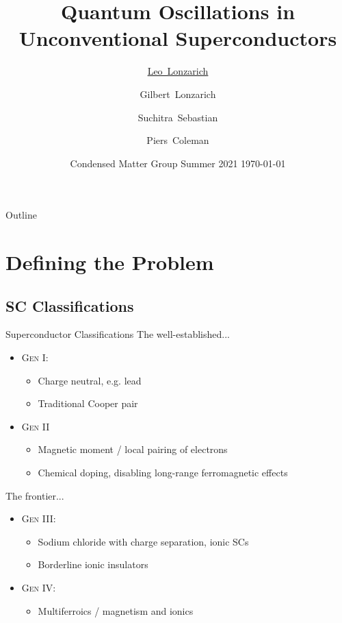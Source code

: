 \documentclass{beamer}
\title[Quantum Oscillations] 
{%
 Quantum Oscillations in\\ Unconventional Superconductors%
}
\author[Lonzarich]
{
  \underline{Leo~Lonzarich} \and Gilbert~Lonzarich\inst{1} \and Suchitra~Sebastian\inst{1} \and Piers~Coleman\inst{2}
  }
\institute[Cambridge]
{
\inst{1}%
Cavendish Laboratory, University of Cambridge, UK\\
\inst{2}%
Materials Theory Group, Rutgers University, USA
}
\date[CMS2021]
{Condensed Matter Group Summer 2021 \hfill \today}
\begin{document}
\begin{frame}
  \titlepage
\end{frame}

\begin{frame}{Outline}
  \tableofcontents
\end{frame}



\section{Defining the Problem}
\subsection{SC Classifications}

\begin{frame}
{Superconductor Classifications}
    The well-established...
    \begin{itemize}
        \item \textsc{Gen I}:
            \begin{itemize}
                \item Charge neutral, e.g. lead
                \item Traditional Cooper pair
            \end{itemize}
        \item \textsc{Gen II}
            \begin{itemize}
                \item Magnetic moment / local pairing of electrons
                \item Chemical doping, disabling long-range ferromagnetic effects
            \end{itemize}
    \end{itemize}
    The frontier...
    \begin{itemize}
        \item \textsc{Gen III}: %
            \begin{itemize}
                \item Sodium chloride with charge separation, ionic SCs
                \item Borderline ionic insulators
            \end{itemize}
        \item \textsc{Gen IV}:
            \begin{itemize}
                \item Multiferroics / magnetism and ionics
            \end{itemize}
    \end{itemize}
        
        
 
\end{frame}
\end{document}
